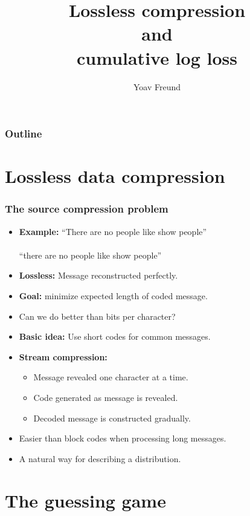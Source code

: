 \documentclass[handout]{beamer}
\title[log loss] %
{Lossless compression \\ and \\ cumulative log loss}
\author[Freund] %
{Yoav Freund}
\institute[Universities of Somewhere and Elsewhere] %
\begin{document}

\begin{frame}
  \titlepage
\end{frame}

\begin{frame}
  \frametitle{Outline}
  \tableofcontents[pausesections]
\end{frame}

\section{Lossless data compression}

\begin{frame}
\frametitle{The source compression problem}
\begin{itemize}
\item
{\bf Example:}
``There are no people like show people'' \\
\pause 
{} \\
\pause
{} ``there are no people like show people''
\item
{\bf Lossless:} Message reconstructed perfectly.
\item
{\bf Goal:} minimize expected length   of coded message. 
\item
Can we do better than  bits per character?
\item
{\bf Basic idea:} Use short codes for common messages.
\item
{\bf Stream compression:} 
\begin{itemize}
\item Message revealed one character at a time.
\item Code generated as message is revealed.
\item Decoded message is constructed gradually.
\end{itemize}
\item Easier than block codes when processing long messages.
\item A natural way for describing a distribution.
\end{itemize}
\end{frame}

\section{The guessing game}
\end{document}
